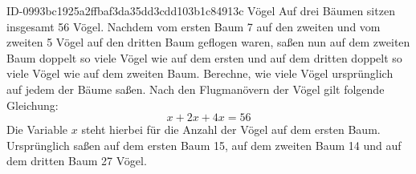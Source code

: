 \begin{exercise}
      {ID-0993bc1925a2ffbaf3da35dd3cdd103b1c84913c}
      {Vögel}
  \ifproblem\problem
    Auf drei Bäumen sitzen insgesamt \num{56} Vögel. Nachdem vom ersten Baum \num{7} auf
    den zweiten und vom zweiten \num{5} Vögel auf den dritten Baum geflogen waren,
    saßen nun auf dem zweiten Baum doppelt so viele Vögel wie auf dem ersten
    und auf dem dritten doppelt so viele Vögel wie auf dem zweiten Baum.
    Berechne, wie viele Vögel ursprünglich auf jedem der Bäume saßen.
  \fi
  \ifoutline\outline
    Nach den \glqq Flugmanövern\grqq{} der Vögel gilt folgende Gleichung:
    \begin{equation*}
      x+2x+4x=\num{56}
    \end{equation*}
    Die Variable $x$ steht hierbei für die Anzahl der Vögel auf dem ersten Baum.
  \fi
  \ifoutcome\outcome
    Ursprünglich saßen auf dem ersten Baum \num{15},
    auf dem zweiten Baum \num{14} und
    auf dem dritten Baum \num{27} Vögel.
  \fi
\end{exercise}
